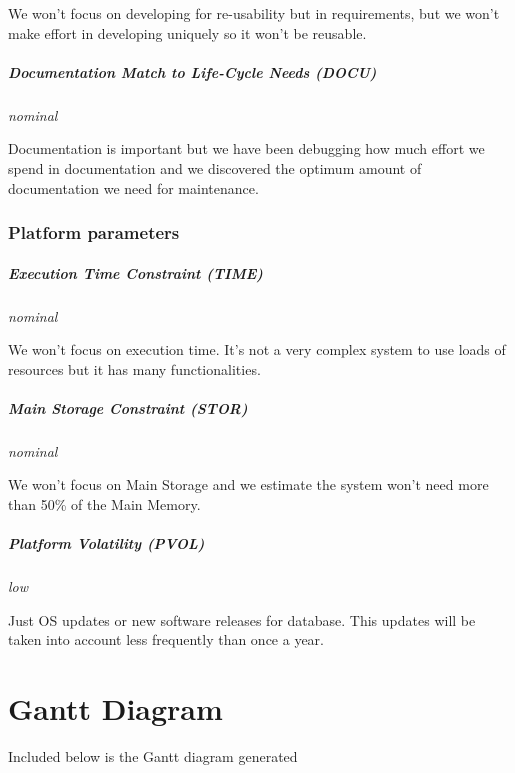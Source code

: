 \documentclass[11pt]{report}
\begin{document}
We won't focus on developing for re-usability but in requirements, but we won't make effort in developing uniquely so it won't be reusable.

\paragraph{Documentation Match to Life-Cycle Needs (DOCU)} \textit{nominal} 

Documentation is important but we have been debugging how much effort we spend in documentation and we discovered the optimum amount of documentation we need for maintenance.

\subsection{Platform parameters}
\paragraph{Execution Time Constraint  (TIME)} \textit{nominal} 

We won't focus on execution time. It's not a very complex system to use loads of resources but it has many functionalities.

\paragraph{Main Storage Constraint (STOR)} \textit{nominal}

We won't focus on Main Storage and we estimate the system won't need more than 50\% of the Main Memory.


\paragraph{Platform Volatility (PVOL) } \textit{low}

Just OS updates or new software releases for database. This updates will be taken into account less frequently than once a year.



\chapter{Gantt Diagram}
\label{chapGantt}
Included below is the Gantt diagram generated


\end{document}

